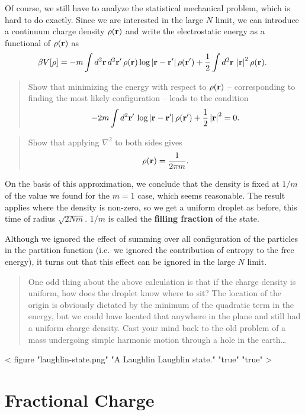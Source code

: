 \documentclass[
  letterpaper,
  DIV=11,
  numbers=noendperiod]{scrreprt}
\begin{document}
Of course, we still have to analyze the statistical mechanical problem,
which is hard to do exactly. Since we are interested in the large \(N\)
limit, we can introduce a continuum charge density \(\rho(\mathbf{r})\) and
write the electrostatic energy as a functional of \(\rho(\mathbf{r})\) as \[
\beta V[\rho] = -m\int d^2\mathbf{r}\, d^2\mathbf{r}'\, \rho(\mathbf{r})\log\left|\mathbf{r}-\mathbf{r}'\right|\rho(\mathbf{r}') + \frac{1}{2}\int d^2\mathbf{r}\, \left|\mathbf{r}\right|^2\rho(\mathbf{r}).\
\]

\begin{quote}
Show that minimizing the energy with respect to \(\rho(\mathbf{r})\) --
corresponding to finding the most likely configuration -- leads to the
condition \[
-2m\int d^2\mathbf{r}'\, \log\left|\mathbf{r}-\mathbf{r}'\right|\rho(\mathbf{r}') + \frac{1}{2}\left|\mathbf{r}\right|^2 = 0.
\]
\end{quote}

\begin{quote}
Show that applying \(\nabla^2\) to both sides gives \[
\rho(\mathbf{r}) = \frac{1}{2\pi m}.
\]
\end{quote}

On the basis of this approximation, we conclude that the density is
fixed at \(1/m\) of the value we found for the \(m=1\) case, which seems
reasonable. The result applies where the density is non-zero, so we get
a uniform droplet as before, this time of radius \(\sqrt{2Nm}\). \(1/m\)
is called the \textbf{filling fraction} of the state.

Although we ignored the effect of summing over all configuration of the
particles in the partition function (i.e.~we ignored the contribution of
entropy to the free energy), it turns out that this effect can be
ignored in the large \(N\) limit.

\begin{quote}
One odd thing about the above calculation is that if the charge density
is uniform, how does the droplet know where to sit? The location of the
origin is obviously dictated by the minimum of the quadratic term in the
energy, but we could have located that anywhere in the plane and still
had a uniform charge density. Cast your mind back to the old problem of
a mass undergoing simple harmonic motion through a hole in the
earth\ldots{}
\end{quote}

{{< figure "laughlin-state.png" "A Laughlin Laughlin state." "true" "true" >}}

\section{Fractional Charge}\label{fractional-charge}
\end{document}
